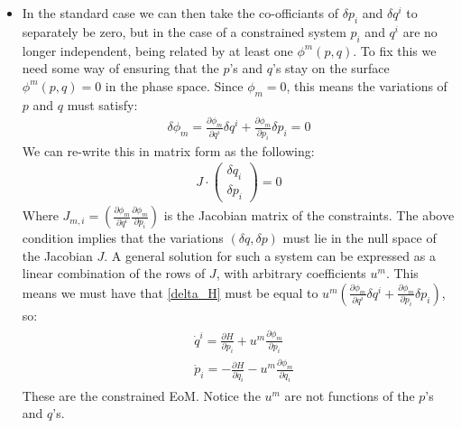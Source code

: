 \documentclass[11pt]{article}
\numberwithin{equation}{section}
\begin{document}
\begin{itemize}
\item In the standard case we can then take the co-officiants of $\delta p_i$ and $\delta q^i$ to separately be zero, but in the case of a constrained system $p_i$ and $q^i$ are no longer independent, being related by at least one $\phi^{m}(p,q)$. To fix this we need some way of ensuring that the $p$'s and $q$'s stay on the surface $\phi^{m}(p,q)=0$ in the phase space. Since $\phi_m=0$, this means the variations of $p$ and $q$ must satisfy:
\begin{align*}
  \delta \phi_m = \frac{\partial \phi_m}{\partial q^i}\delta q^i+\frac{\partial \phi_m}{\partial p_i}\delta p_i =0
\end{align*}
We can re-write this in matrix form as the following:
\begin{align*}
  J \cdot \left(\begin{matrix}
    \delta q_i \\
    \delta p_i
  \end{matrix}\right) = 0 
\end{align*}
Where $J_{m,i} = \left(\frac{\partial \phi_m}{\partial q^i} \frac{\partial \phi_m}{\partial p_i}\right)$ is the Jacobian matrix of the constraints. The above condition implies that the variations $(\delta q,\delta p)$ must lie in the null space of the Jacobian $J$. A general solution for such a system can be expressed as a linear combination of the rows of $J$, with arbitrary coefficients $u^m$. This means we must have that \ref{delta_H} must be equal to $u^m\left(\frac{\partial \phi_m}{\partial q^i}\delta q^i + \frac{\partial \phi_m}{\partial p_i}\delta p_i \right)$, so:
  \begin{align}
       \label{eom_constr} 
     \begin{split}
       &\dot{q}^i = \frac{\partial H}{\partial p_i} + u^m\frac{\partial \phi_m}{\partial p_i}\\
     & \dot{p}_i = -\frac{\partial H}{\partial q_i} - u^m\frac{\partial \phi_m}{\partial q_i}
     \end{split}
   \end{align}
   These are the constrained EoM. Notice the $u^m$ are not functions of the $p$'s and $q$'s. 
   \end{itemize}
\end{document}
